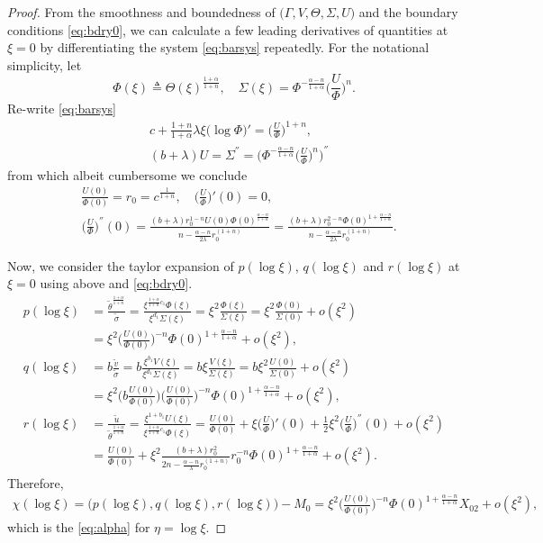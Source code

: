 \documentclass[a4paper,11pt]{article}
\def\blue{\color{blue}}
\def\tv{{\tilde{v}}}
\def\tth{{\tilde{\theta}}}
\def\ts{{\tilde{\sigma}}}
\def\tu{{\tilde{u}}}
\begin{document}
\begin{proof}
From the smoothness and boundedness of $\big(\Gamma,V,\Theta,\Sigma,U\big)$ and the boundary conditions \eqref{eq:bdry0}, we can calculate a few leading derivatives of quantities at $\xi=0$ by differentiating the system \eqref{eq:barsys} repeatedly. For the notational simplicity, let
$$\Phi(\xi) \triangleq \Theta(\xi)^{\frac{1+\alpha}{1+n}}, \quad \Sigma(\xi) = \Phi^{-\frac{\alpha-n}{1+\alpha}} \Big(\frac{U}{\Phi}\Big)^n.$$
Re-write \eqref{eq:barsys}
{\blue
\begin{align*}
  &c + \frac{1+n}{1+\alpha} \lambda \xi \big(\log\Phi\big)' = \Big(\frac{U}{\Phi}\Big)^{1+n},\\
  &(b+\lambda)U = \Sigma^{''} = \Big(\Phi^{-\frac{\alpha-n}{1+\alpha}}\Big(\frac{U}{\Phi}\Big)^{n}\Big)^{''}
\end{align*}
}
from which albeit cumbersome we conclude 
\begin{align*}
&\frac{U(0)}{\Phi(0)} = r_0 = c^{\frac{1}{1+n}},  \quad \Big(\frac{U}{\Phi}\Big)'(0)=0, \\
&\Big(\frac{U}{\Phi}\Big)^{''}(0) = \frac{ (b+\lambda) r_0^{1-n} U(0)\Phi(0)^{\frac{\alpha-n}{1+\alpha}} }{ n - \frac{\alpha-n}{2\lambda}r_0^{(1+n)}} = \frac{ (b+\lambda) r_0^{2-n} \Phi(0)^{1+\frac{\alpha-n}{1+\alpha}} }{ n - \frac{\alpha-n}{2\lambda}r_0^{(1+n)}}.
\end{align*}

Now, we consider the taylor expansion of $p(\log\xi)$, $q(\log\xi)$ and $r(\log\xi)$ at $\xi=0$ using above and \eqref{eq:bdry0}.
\begin{align*}
 p(\log\xi) &= \frac{ \tth^{\frac{1+\alpha}{1+n}} }{\ts} = \frac{ \xi^{\frac{1+\alpha}{1+n}c_1} \Phi(\xi)}{\xi^{d_1} \Sigma(\xi)} = \xi^2\frac{\Phi(\xi)}{\Sigma(\xi)} = \xi^2\frac{\Phi(0)}{\Sigma(0)} + o(\xi^2) \\
 &= \xi^2\Big(\frac{U(0)}{\Phi(0)}\Big)^{-n}\Phi(0)^{1+\frac{\alpha-n}{1+\alpha}} + o(\xi^2),\\
 q(\log\xi) &= b\frac{\tv}{\ts} = b\frac{ \xi^{b_1} V(\xi) }{ \xi^{d_1} \Sigma(\xi)} = b\xi\frac{ V(\xi) }{ \Sigma(\xi)} = b\xi^2 \frac{U(0)}{\Sigma(0)}+ o(\xi^2) \\
 &= \xi^2\Big(b\frac{U(0)}{\Phi(0)}\Big)\Big(\frac{U(0)}{\Phi(0)}\Big)^{-n}\Phi(0)^{1+\frac{\alpha-n}{1+\alpha}} + o(\xi^2),\\
 r(\log\xi) &= \frac{\tu}{ \tth^{\frac{1+\alpha}{1+n}} } = \frac{ \xi^{1+b_1}U(\xi) }{ \xi^{\frac{1+\alpha}{1+n}c_1}\Phi(\xi) } = \frac{ U(0) }{ \Phi(0) }+ \xi \Big(\frac{U}{\Phi}\Big)'(0) + \frac{1}{2}\xi^2\Big(\frac{U}{\Phi}\Big)^{''}(0) + o(\xi^2)\\
  &=\frac{ U(0) }{ \Phi(0) } + \xi^2\frac{ (b+\lambda) r_0^{2} }{ 2n - \frac{\alpha-n}{\lambda}r_0^{(1+n)}} r_0^{-n} \Phi(0)^{1+\frac{\alpha-n}{1+\alpha}} + o(\xi^2).
\end{align*}
Therefore,
\begin{align*}
\chi(\log\xi) = \big(p(\log\xi),q(\log\xi),r(\log\xi)\big) -M_0 = \xi^2\Big(\frac{U(0)}{\Phi(0)}\Big)^{-n}\Phi(0)^{1+\frac{\alpha-n}{1+\alpha}} X_{02} + o(\xi^2),
\end{align*}
which is the \eqref{eq:alpha} for $\eta=\log\xi$.
\end{proof}
\end{document}
